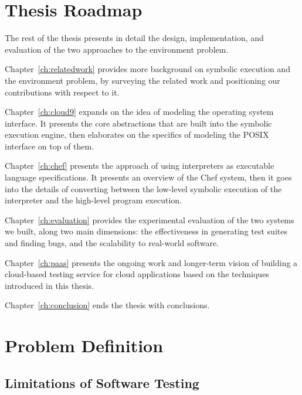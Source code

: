 
\section{Thesis Roadmap}

The rest of the thesis presents in detail the design, implementation, and evaluation of the two approaches to the environment problem.

Chapter~\ref{ch:relatedwork} provides more background on symbolic execution and the environment problem, by surveying the related work and positioning our contributions with respect to it.

Chapter~\ref{ch:cloud9} expands on the idea of modeling the operating system interface.  It presents the core abstractions that are built into the symbolic execution engine, then elaborates on the specifics of modeling the POSIX interface on top of them.

Chapter~\ref{ch:chef} presents the approach of using interpreters as executable language specifications.  It presents an overview of the Chef system, then it goes into the details of converting between the low-level symbolic execution of the interpreter and the high-level program execution.

Chapter~\ref{ch:evaluation} provides the experimental evaluation of the two systems we built, along two main dimensions: the effectiveness in generating test suites and finding bugs, and the scalability to real-world software.

Chapter~\ref{ch:paas} presents the ongoing work and longer-term vision of building a cloud-based testing service for cloud applications based on the techniques introduced in this thesis.

Chapter~\ref{ch:conclusion} ends the thesis with conclusions.










\iffalse
\section{Problem Definition}

\subsection{Limitations of Software Testing}

